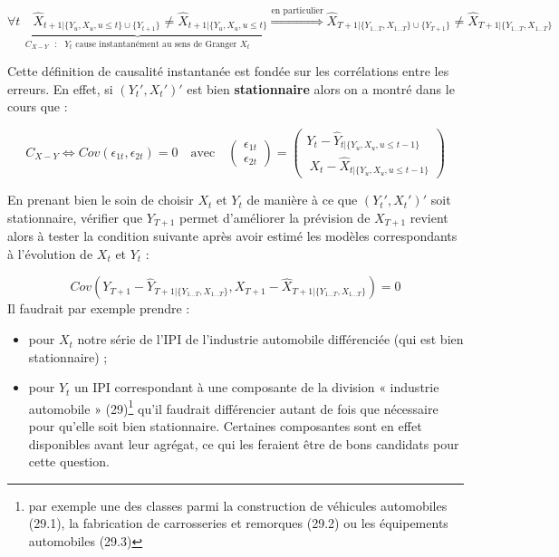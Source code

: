 \documentclass[,french]{article}
\providecommand{\tightlist}{%
  \setlength{\itemsep}{0pt}\setlength{\parskip}{0pt}}
\begin{document}
\[ \underbrace{\forall t \quad \widehat X_{t+1 \vert \{Y_u, X_u, u \le t \}  \cup \{Y_{t+1}\}}   \ne \widehat X_{t+1 \vert \{Y_u, X_u, u \le t \}}}_{C_{X - Y} \text{ }:\text{ } Y_t \textrm{ cause instantanément au sens de Granger } X_t} \overset{\text{en particulier}}{\Longrightarrow} \widehat X_{T+1 \vert \{Y_{1 \dots T},X_{1 \dots T}\} \cup \{Y_{T+1}\}} \ne \widehat X_{T+1 \vert \{Y_{1 \dots T},X_{1 \dots T}\}}\]

Cette définition de causalité instantanée est fondée sur les corrélations entre les erreurs. En effet, si \((Y_t',X_t')'\) est bien \textbf{stationnaire} alors on a montré dans le cours que :

\[C_{X - Y} \iff Cov(\epsilon_{1t},\epsilon_{2t}) = 0 \quad \text{avec} \quad \begin{pmatrix} \epsilon_{1t}
\\\epsilon_{2t}\end{pmatrix} = \begin{pmatrix} Y_t - \widehat Y_{t \vert \{Y_u, X_u, u \le t-1 \}}
\\\ X_t - \widehat X_{t \vert \{Y_u, X_u, u \le t-1 \}}\end{pmatrix}\]

En prenant bien le soin de choisir \(X_t\) et \(Y_t\) de manière à ce que \((Y_t',X_t')'\) soit stationnaire, vérifier que \(Y_{T+1}\) permet d'améliorer la prévision de \(X_{T+1}\) revient alors à tester la condition suivante après avoir estimé les modèles correspondants à l'évolution de \(X_t\) et \(Y_t\) :

\[Cov( Y_{T+1} - \widehat Y_{T+1 \vert \{Y_{1 \dots T},X_{1 \dots T} \} }, X_{T+1} - \widehat X_{T+1 \vert \{Y_{1 \dots T},X_{1 \dots T} \} }) = 0\]
Il faudrait par exemple prendre :

\begin{itemize}
\tightlist
\item
  pour \(X_t\) notre série de l'IPI de l'industrie automobile différenciée (qui est bien stationnaire) ;
\item
  pour \(Y_t\) un IPI correspondant à une composante de la division « industrie automobile » (29)\footnote{par exemple une des classes parmi la construction de véhicules automobiles (29.1), la fabrication de carrosseries et remorques (29.2) ou les équipements automobiles (29.3)} qu'il faudrait différencier autant de fois que nécessaire pour qu'elle soit bien stationnaire. Certaines composantes sont en effet disponibles avant leur agrégat, ce qui les feraient être de bons candidats pour cette question.
\end{itemize}
\end{document}

